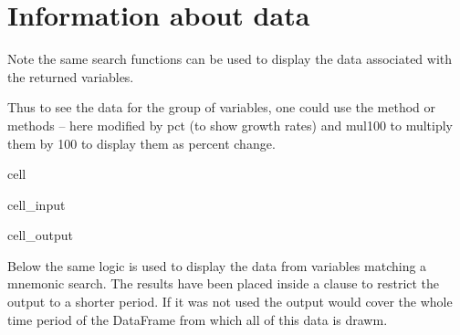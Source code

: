 \documentclass[letterpaper,10pt,english]{jupyterBook}
\begin{document}
\section{Information about data}
\label{\detokenize{content/05_WBModels/LoadingWBModel:information-about-data}}
\sphinxAtStartPar
Note the same search functions can be used to display the data associated with the returned variables.

\sphinxAtStartPar
Thus to see the data for the  group of variables, one could use the  method or  methods – here modified by pct (to show growth rates) and mul100 to multiply them by 100 to display them as percent change.

\begin{sphinxuseclass}{cell}\begin{sphinxVerbatimInput}

\begin{sphinxuseclass}{cell_input}
\begin{sphinxVerbatim}[commandchars=\\\{\}]
\PYG{p}{[}\PYG{p}{]}
\end{sphinxVerbatim}

\end{sphinxuseclass}\end{sphinxVerbatimInput}
\begin{sphinxVerbatimOutput}

\begin{sphinxuseclass}{cell_output}
\noindent{}

\end{sphinxuseclass}\end{sphinxVerbatimOutput}

\end{sphinxuseclass}
\sphinxAtStartPar
Below the same logic is used to display the data from variables matching a mnemonic search.  The results have been placed inside a \sphinxcode{\sphinxupquote{with m{[}pak.set\_smpl()}} clause to restrict the output to a shorter period.  If it was not used the output would cover the whole time period of the  DataFrame from which all of this data is drawm.
\end{document}
